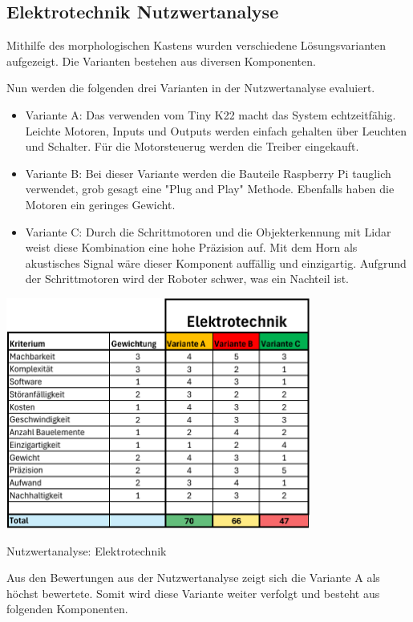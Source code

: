 \subsection{Elektrotechnik Nutzwertanalyse}

Mithilfe des morphologischen Kastens wurden verschiedene Lösungsvarianten aufgezeigt. Die Varianten bestehen aus diversen Komponenten. 


Nun werden die folgenden drei Varianten in der Nutzwertanalyse evaluiert.

\begin{itemize}
    \item Variante A: Das verwenden vom Tiny K22 macht das System echtzeitfähig. Leichte Motoren, Inputs und Outputs werden einfach gehalten über Leuchten und Schalter. Für die Motorsteuerug werden die Treiber eingekauft.
    \item Variante B: Bei dieser Variante werden die Bauteile Raspberry Pi tauglich verwendet, grob gesagt eine "Plug and Play" Methode. Ebenfalls haben die Motoren ein geringes Gewicht.
    \item Variante C: Durch die Schrittmotoren und die Objekterkennung mit Lidar weist diese Kombination eine hohe Präzision auf. Mit dem Horn als akustisches Signal wäre dieser Komponent auffällig und einzigartig. Aufgrund der Schrittmotoren wird der Roboter schwer, was ein Nachteil ist.
\end{itemize}


\begin{table}[H]
\centering
\includegraphics[width=0.75\textwidth]{assets/Nutzwertanalyse-ET.pdf}
\caption{Nutzwertanalyse: Elektrotechnik}
\label{table:nutzwert-ET}
\end{table}

Aus den Bewertungen aus der Nutzwertanalyse zeigt sich die Variante A als höchst bewertete. Somit wird diese Variante weiter verfolgt und besteht aus folgenden Komponenten.

